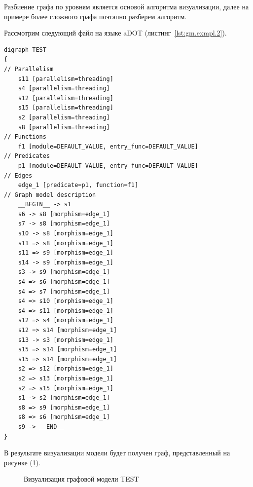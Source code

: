 Разбиение графа по уровням является основой алгоритма визуализации, далее на примере более сложного графа поэтапно разберем алгоритм.

Рассмотрим следующий файл на языке aDOT (листинг~\ref{lst:gm.exmpl.2}).

\begin{lstlisting}[frame=single, label={lst:gm.exmpl.2}, caption={Пример aDOT-определения графовой модели \textsf{TEST}}, language=aDOTExample]
digraph TEST
{
// Parallelism
	s11 [parallelism=threading]
	s4 [parallelism=threading]
	s12 [parallelism=threading]
	s15 [parallelism=threading]
	s2 [parallelism=threading]
	s8 [parallelism=threading]
// Functions
	f1 [module=DEFAULT_VALUE, entry_func=DEFAULT_VALUE]
// Predicates
	p1 [module=DEFAULT_VALUE, entry_func=DEFAULT_VALUE]
// Edges
	edge_1 [predicate=p1, function=f1]
// Graph model description
	__BEGIN__ -> s1
	s6 -> s8 [morphism=edge_1]
	s7 -> s8 [morphism=edge_1]
	s10 -> s8 [morphism=edge_1]
	s11 => s8 [morphism=edge_1]
	s11 => s9 [morphism=edge_1]
	s14 -> s9 [morphism=edge_1]
	s3 -> s9 [morphism=edge_1]
	s4 => s6 [morphism=edge_1]
	s4 => s7 [morphism=edge_1]
	s4 => s10 [morphism=edge_1]
	s4 => s11 [morphism=edge_1]
	s12 => s4 [morphism=edge_1]
	s12 => s14 [morphism=edge_1]
	s13 -> s3 [morphism=edge_1]
	s15 => s14 [morphism=edge_1]
	s15 => s14 [morphism=edge_1]
	s2 => s12 [morphism=edge_1]
	s2 => s13 [morphism=edge_1]
	s2 => s15 [morphism=edge_1]
	s1 -> s2 [morphism=edge_1]
	s8 => s9 [morphism=edge_1]
	s8 => s6 [morphism=edge_1]
	s9 -> __END__ 
}
\end{lstlisting}

В результате визуализации модели будет получен граф, представленный на рисунке (\ref{fig:main_graph}).

\begin{figure}[ht!]
\caption{Визуализация графовой модели \textsf{TEST}}\label{fig:main_graph}
\end{figure}

